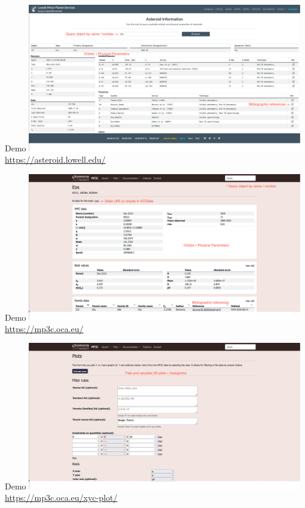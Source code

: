 \begin{frame}[t]{Demo}
  \includegraphics[width=0.9\textwidth]{gfx/demo_lowell.png}
  \url{https://asteroid.lowell.edu/}
\end{frame}

\begin{frame}[t]{Demo}
  \includegraphics[width=0.9\textwidth]{gfx/demo_mp3c.png}
  \url{https://mp3c.oca.eu/}
\end{frame}

\begin{frame}[t]{Demo}
  \includegraphics[width=0.9\textwidth]{gfx/demo_mp3c_2.png}
  \url{https://mp3c.oca.eu/xyc-plot/}
\end{frame}

